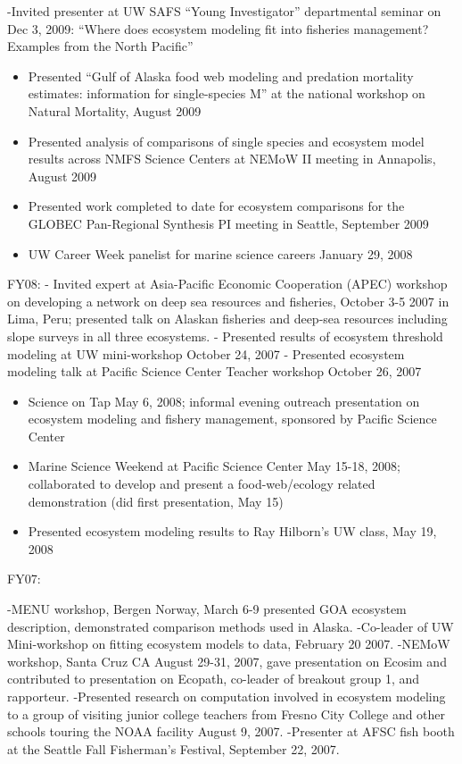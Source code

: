 \documentclass[11pt, a4paper]{awesome-cv}
\providecommand{\tightlist}{%
	\setlength{\itemsep}{0pt}\setlength{\parskip}{0pt}}
\begin{document}
-Invited presenter at UW SAFS ``Young Investigator'' departmental
seminar on Dec 3, 2009: ``Where does ecosystem modeling fit into
fisheries management? Examples from the North Pacific''

\begin{itemize}
\item
  Presented ``Gulf of Alaska food web modeling and predation mortality
  estimates: information for single-species M'' at the national workshop
  on Natural Mortality, August 2009
\item
  Presented analysis of comparisons of single species and ecosystem
  model results across NMFS Science Centers at NEMoW II meeting in
  Annapolis, August 2009
\item
  Presented work completed to date for ecosystem comparisons for the
  GLOBEC Pan-Regional Synthesis PI meeting in Seattle, September 2009
\item
  UW Career Week panelist for marine science careers January 29, 2008
\end{itemize}

FY08: - Invited expert at Asia-Pacific Economic Cooperation (APEC)
workshop on developing a network on deep sea resources and fisheries,
October 3-5 2007 in Lima, Peru; presented talk on Alaskan fisheries and
deep-sea resources including slope surveys in all three ecosystems. -
Presented results of ecosystem threshold modeling at UW mini-workshop
October 24, 2007 - Presented ecosystem modeling talk at Pacific Science
Center Teacher workshop October 26, 2007

\begin{itemize}
\tightlist
\item
  Science on Tap May 6, 2008; informal evening outreach presentation on
  ecosystem modeling and fishery management, sponsored by Pacific
  Science Center
\item
  Marine Science Weekend at Pacific Science Center May 15-18, 2008;
  collaborated to develop and present a food-web/ecology related
  demonstration (did first presentation, May 15)
\item
  Presented ecosystem modeling results to Ray Hilborn's UW class, May
  19, 2008
\end{itemize}

FY07:

-MENU workshop, Bergen Norway, March 6-9 presented GOA ecosystem
description, demonstrated comparison methods used in Alaska. -Co-leader
of UW Mini-workshop on fitting ecosystem models to data, February 20
2007. -NEMoW workshop, Santa Cruz CA August 29-31, 2007, gave
presentation on Ecosim and contributed to presentation on Ecopath,
co-leader of breakout group 1, and rapporteur. -Presented research on
computation involved in ecosystem modeling to a group of visiting junior
college teachers from Fresno City College and other schools touring the
NOAA facility August 9, 2007. -Presenter at AFSC fish booth at the
Seattle Fall Fisherman's Festival, September 22, 2007.
\end{document}

